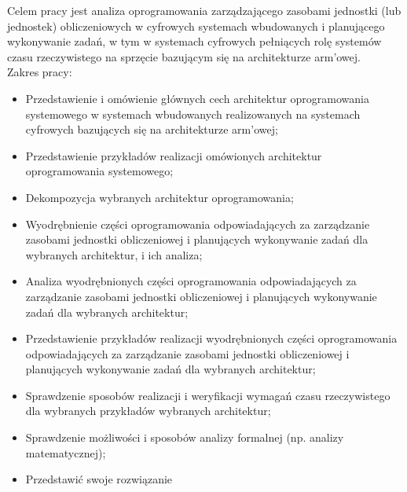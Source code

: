 \documentclass[../../main]{subfiles}
\begin{document}
Celem pracy jest analiza oprogramowania zarządzającego zasobami jednostki (lub jednostek)
obliczeniowych w cyfrowych systemach wbudowanych i planującego wykonywanie zadań, w tym w systemach
cyfrowych pełniących rolę systemów czasu rzeczywistego na sprzęcie bazującym się na architekturze
\acrshort{arm}'owej.\\
Zakres pracy:
\begin{itemize}
    \item Przedstawienie i omówienie głównych cech architektur oprogramowania systemowego w systemach wbudowanych realizowanych na systemach cyfrowych bazujących się na architekturze \acrshort{arm}'owej;
    \item Przedstawienie przykładów realizacji omówionych architektur oprogramowania systemowego;
    \item Dekompozycja wybranych architektur oprogramowania;
    \item Wyodrębnienie części oprogramowania odpowiadających za zarządzanie zasobami jednostki obliczeniowej i planujących wykonywanie zadań dla wybranych architektur, i ich analiza;
    \item Analiza wyodrębnionych części oprogramowania odpowiadających za zarządzanie zasobami jednostki obliczeniowej i planujących wykonywanie zadań dla wybranych architektur;
    \item Przedstawienie przykładów realizacji wyodrębnionych części oprogramowania odpowiadających za zarządzanie zasobami jednostki obliczeniowej i planujących wykonywanie zadań dla wybranych architektur;
    \item Sprawdzenie sposobów realizacji i weryfikacji wymagań czasu rzeczywistego dla wybranych przykładów wybranych architektur;
    \item Sprawdzenie możliwości i sposobów analizy formalnej (np. analizy matematycznej);
    \item Przedstawić swoje rozwiązanie
\end{itemize}
\end{document}
